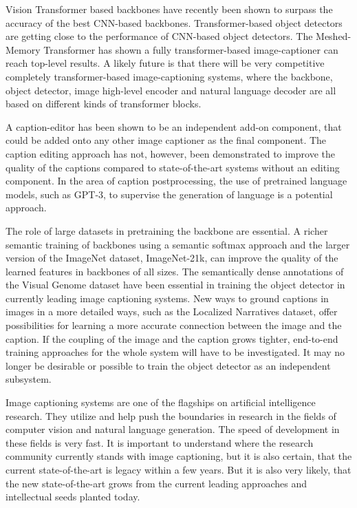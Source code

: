 \documentclass[english,twoside,openright]{HYgraduMLDS}
\begin{document}
Vision Transformer based backbones have recently been shown to surpass the accuracy of the best CNN-based backbones. Transformer-based object detectors are getting close to the performance of CNN-based object detectors. The Meshed-Memory Transformer has shown a fully transformer-based image-captioner can reach top-level results. A likely future is that there will be very competitive completely transformer-based image-captioning systems, where the backbone, object detector, image high-level encoder and natural language decoder are all based on different kinds of transformer blocks.

A caption-editor has been shown to be an independent add-on component, that could be added onto any other image captioner as the final component. The caption editing approach has not, however, been demonstrated to improve the quality of the captions compared to state-of-the-art systems without an editing component. In the area of caption postprocessing, the use of pretrained language models, such as GPT-3, to supervise the generation of language is a potential approach.

The role of large datasets in pretraining the backbone are essential. A richer semantic training of backbones using a semantic softmax approach and the larger version of the ImageNet dataset, ImageNet-21k, can improve the quality of the learned features in backbones of all sizes. The semantically dense annotations of the Visual Genome dataset have been essential in training the object detector in currently leading image captioning systems. New ways to ground captions in images in a more detailed ways, such as the Localized Narratives dataset, offer possibilities for learning a more accurate connection between the image and the caption. If the coupling of the image and the caption grows tighter, end-to-end training approaches for the whole system will have to be investigated. It may no longer be desirable or possible to train the object detector as an independent subsystem.

Image captioning systems are one of the flagships on artificial intelligence research. They utilize and help push the boundaries in research in the fields of computer vision and natural language generation. The speed of development in these fields is very fast. It is important to understand where the research community currently stands with image captioning, but it is also certain, that the current state-of-the-art is legacy within a few years. But it is also very likely, that the new state-of-the-art grows from the current leading approaches and intellectual seeds planted today.
\end{document}
